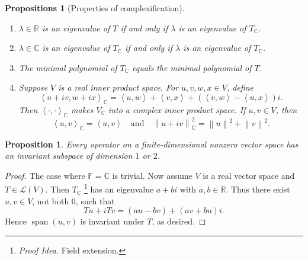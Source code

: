 \documentclass[colorlinks]{tufte-handout}
\theoremstyle{plain} %
\newtheorem{prop}[thm]{Proposition}
\newtheorem{props}[thm]{Propositions}
\theoremstyle{definition}
\theoremstyle{remark}
\def\idea{\textit{\color[rgb]{0,0,.55}Proof Idea. }}
\newcommand{\norm}[1]{\mathopen{}\left\lVert#1\right\rVert}
\newcommand{\inp}[2]{\mathopen{}\left\langle#1,#2\right\rangle}
\newcommand{\R}{\mathbb{R}}
\newcommand{\C}{\mathbb{C}}
\newcommand{\F}{\mathbb{F}}
\renewcommand{\L}{\mathcal{L}}
\DeclareMathOperator{\spn}{span}
\begin{document}
\begin{props}[Properties of complexification]
	\begin{enumerate}
		\item $\lambda\in\R$ is an eigenvalue of $T$ if and only if $\lambda$ is an eigenvalue of $T_\C$.
		\item $\lambda\in\C$ is an eigenvalue of $T_\C$ if and only if $\overline{\lambda}$ is an eigenvalue of $T_\C$.
		\item The minimal polynomial of $T_\C$ equals the minimal polynomial of $T$.
		\item Suppose $V$ is a real inner product space. For $u,v,w,x\in V$, define
		\[\inp{u+iv}{w+ix}_\C=\inp{u}{w}+\inp{v}{x}+(\inp{v}{w}-\inp{u}{x})i.\]
		Then $\inp{\cdot}{\cdot}_\C$ makes $V_\C$ into a complex inner product space. If $u,v\in V$, then
		\[\inp{u}{v}_\C=\inp{u}{v}\quad\text{and}\quad\norm{u+iv}_\C^2=\norm{u}^2+\norm{v}^2.\]
	\end{enumerate}
\end{props}

\begin{prop}
	Every operator on a finite-dimensional nonzero vector space has an invariant subspace of dimension $1$ or $2$.
\end{prop}
\begin{proof}
	The case where $\F=\C$ is trivial. Now assume $V$ is a real vector space and $T\in\L(V)$. Then $T_\C$%
	\footnote{\idea Field extension.}
	has an eigenvalue $a+bi$ with $a,b\in\R$. Thus there exist $u,v\in V$, not both $0$, such that
	\[Tu+iTv=(au-bv)+(av+bu)i.\]
	Hence $\spn(u,v)$ is invariant under $T$, as desired.
\end{proof}
\end{document}
